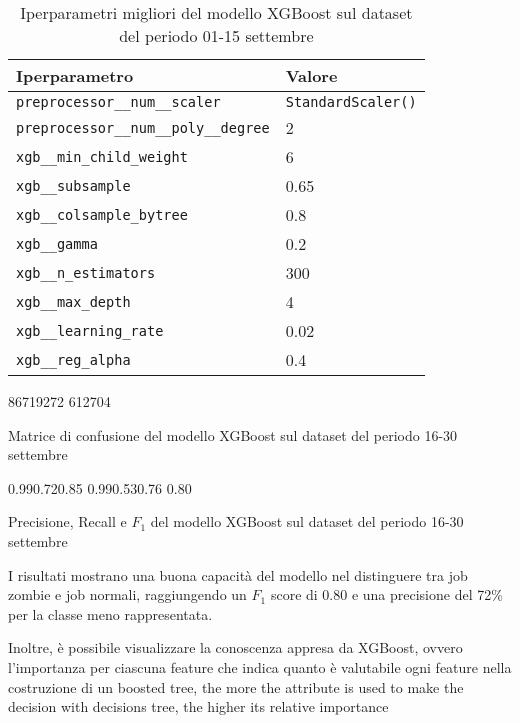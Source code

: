 \begin{table}[ht]
    \centering
    \begin{tabular}{ll}
        \toprule
        \textbf{Iperparametro} & \textbf{Valore} \\
        \midrule
        \texttt{preprocessor\_\_num\_\_scaler}         & \texttt{StandardScaler()} \\
        \texttt{preprocessor\_\_num\_\_poly\_\_degree} & 2 \\
        \texttt{xgb\_\_min\_child\_weight}             & 6 \\
        \texttt{xgb\_\_subsample}                      & 0.65 \\
        \texttt{xgb\_\_colsample\_bytree}              & 0.8 \\
        \texttt{xgb\_\_gamma}                          & 0.2 \\
        \texttt{xgb\_\_n\_estimators}                  & 300 \\
        \texttt{xgb\_\_max\_depth}                     & 4 \\
        \texttt{xgb\_\_learning\_rate}                 & 0.02 \\
        \texttt{xgb\_\_reg\_alpha}                     & 0.4 \\
        \bottomrule
    \end{tabular}
    \caption{Iperparametri migliori del modello XGBoost sul dataset del periodo 01-15 settembre}
    \label{table:xgb_hyperparams}
\end{table}

\begin{table}[!ht]
   \centering
   \confusionmatrix%
   {86719}{272}%
   {612}{704}
   \caption{Matrice di confusione del modello XGBoost sul dataset del periodo 16-30
   settembre}
   \label{table:confusion_matrix_xgboost_sep}
\end{table}

\begin{table}[!ht]
   \centering
   \scores%
   {0.99}{0.72}{0.85}%
   {0.99}{0.53}{0.76}%
   {0.80}
   \caption{Precisione, Recall e $F_1$ del modello XGBoost sul dataset del
   periodo 16-30 settembre}
   \label{table:scores_xgboost_sep}
\end{table}

I risultati mostrano una buona capacità del modello nel distinguere tra job
zombie e job normali, raggiungendo un $F_1$ score di 0.80 e una precisione del
72\% per la classe meno rappresentata. 

Inoltre, è possibile visualizzare la conoscenza appresa da XGBoost, ovvero
l'importanza per ciascuna feature che indica quanto è valutabile ogni
feature nella costruzione di un boosted tree, the more the attribute is used
to make the decision with decisions tree, the higher its relative importance

